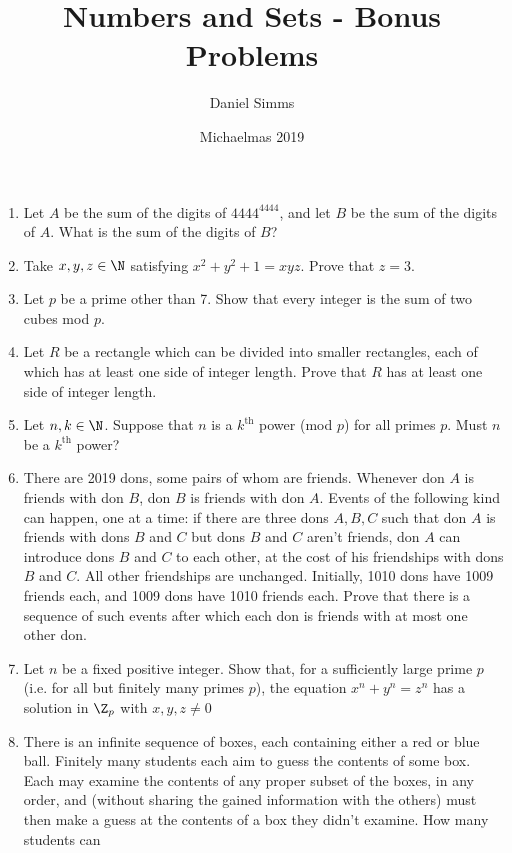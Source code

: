 \documentclass[12pt,a4paper]{article}
\author{Daniel Simms}
\date{Michaelmas 2019}
\title{Numbers and Sets - Bonus Problems}
\begin{document}
\maketitle

\begin{enumerate}
 \item
  Let \(A\) be the sum of the digits of \(4444^{4444}\), and let \(B\) be the
  sum of the digits of \(A\). What is the sum of the digits of \(B\)?
 \item
  Take \(x, y, z \in \N\) satisfying \(x^2 + y^2 + 1 = xyz\). Prove that
  \(z = 3\).
 \item
  Let \(p\) be a prime other than 7. Show that every integer is the sum of two
  cubes mod \(p\).
 \item
  Let \(R\) be a rectangle which can be divided into smaller rectangles, each of
  which has at least one side of integer length. Prove that \(R\) has at least
  one side of integer length.
 \item
  Let \(n, k \in \N\). Suppose that \(n\) is a \(k^{\mathrm{th}}\) power (mod
  \(p\)) for all primes \(p\). Must \(n\) be a \(k^{\mathrm{th}}\) power?
 \item
  There are 2019 dons, some pairs of whom are friends. Whenever don \(A\) is
  friends with don \(B\), don \(B\) is friends with don \(A\). Events of the
  following kind can happen, one at a time: if there are three dons \(A, B, C\)
  such that don \(A\) is friends with dons \(B\) and \(C\) but dons \(B\) and
  \(C\) aren't friends, don \(A\) can introduce dons \(B\) and \(C\) to each
  other, at the cost of his friendships with dons \(B\) and \(C\). All other
  friendships are unchanged. Initially, 1010 dons have 1009 friends each, and
  1009 dons have 1010 friends each. Prove that there is a sequence of such
  events after which each don is friends with at most one other don.
 \item
  Let \(n\) be a fixed positive integer. Show that, for a sufficiently large
  prime \(p\) (i.e. for all but finitely many primes \(p\)), the equation
  \(x^n + y ^n = z^n\) has a solution in \(\Z_p\) with \(x, y, z \ne 0\)
 \item
  There is an infinite sequence of boxes, each containing either a red or blue
  ball. Finitely many students each aim to guess the contents of some box. Each
  may examine the contents of any proper subset of the boxes, in any order, and
  (without sharing the gained information with the others) must then make a
  guess at the contents of a box they didn't examine. How many students can

\end{enumerate}
\end{document}
